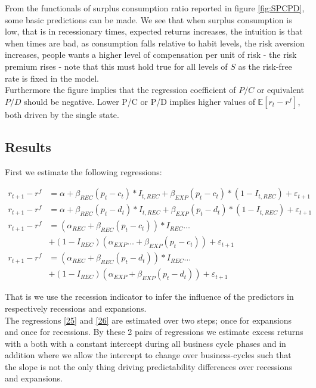 From the functionals of surplus consumption ratio reported in figure \ref{fig:SPCPD}, some basic predictions can be made. We see that when surplus consumption is low, that is in recessionary times, expected returns increases, the intuition is that when times are bad, as consumption falls relative to habit levels, the risk aversion increases, people wants a higher level of compensation per unit of risk - the risk premium rises - note that this must hold true for all levels of $S$ as the risk-free rate is fixed in the model. \\
Furthermore the figure implies that the regression coefficient of $P/C$ or equivalent $P/D$ should be negative. Lower P/C or P/D implies higher values of $\mathbb{E}\left[r_t-r^f\right]$, both driven by the single state.  


\subsection{Results}

First we estimate the following regressions:

\begin{align}
     r_{t+1} - r^{f} &= \alpha + \beta_{REC} \left( p_t - c_t \right) * I_{t,REC} + \beta_{EXP} \left( p_t - c_t \right) * \left(1 - I_{t,REC}\right)  + \varepsilon_{t+1} \label{23}\\
      r_{t+1} - r^{f} &= \alpha + \beta_{REC} \left( p_t - d_t \right) * I_{t,REC} + \beta_{EXP} \left( p_t - d_t \right) * \left(1 - I_{t,REC}\right)  + \varepsilon_{t+1} \label{24}\\
      r_{t+1} - r^{f} &= \left(\alpha_{REC} + \beta_{REC} \left(p_t - c_t\right)\right)*I_{REC}\dots \nonumber\\
      & + \left(1-I_{REC}\right) \left( \alpha_{EXP}\dots + \beta_{EXP}\left(p_t - c_t \right) \right) + \varepsilon_{t+1} \label{25}\\
r_{t+1} - r^{f} &= \left(\alpha_{REC} + \beta_{REC} \left(p_t - d_t\right)\right)*I_{REC}\dots \nonumber\\
& + \left(1-I_{REC}\right) \left( \alpha_{EXP} + \beta_{EXP}\left(p_t - d_t \right) \right) + \varepsilon_{t+1} \label{26}      
\end{align}



That is we use the recession indicator to infer the influence of the predictors in respectively recessions and expansions.\\

The regressions \eqref{25} and \eqref{26} are estimated over two steps; once for expansions and once for recessions. By these 2 pairs of regressions we estimate excess returns with a both with a constant intercept during all business cycle phases and in addition where we allow the intercept to change over business-cycles such that the slope is not the only thing driving predictability differences over recessions and expansions.


